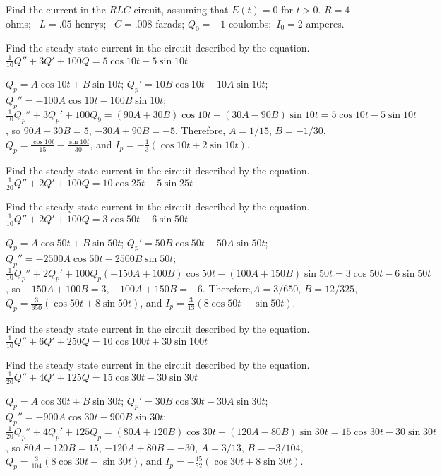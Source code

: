 \documentclass{ximera}
\begin{document}
\begin{problem}\label{exer:6.3.5}
Find the current in the
$RLC$ circuit, assuming that $E(t)=0$ for $t>0$.  $R=4$ ohms;  \, $L=.05$ henrys;  \, $C=.008$ farads;   $Q_0=-1$
coulombs;  \,$I_0=2$ amperes.
\end{problem}

\begin{problem}\label{exer:6.3.6}
Find the steady
state current in the circuit described by the  equation.
$\frac{1}{10}Q''+3Q'+100Q=5\cos10t-5\sin10t$

\begin{solution}
    $Q_p=A\cos10t+B\sin10t$;
$Q_p'=10B\cos10t-10A\sin10t$;
$Q_p''=-100A\cos10t-100B\sin10t$;
$\frac{1}{10}Q_p''+3Q_p'+100Q_9=
(90A+30B)\cos10t-(30A-90B)\sin10t=5\cos10t-5\sin10t$,
so $90A+30B=5$, $-30A+90B=-5$. Therefore, $A=1/15$, $B=-1/30$,
$Q_p=\frac{\cos10t}{15}-\frac{\sin10t}{30}$, and
$I_p=-\frac{1}{3}(\cos10t+2\sin10t)$.
\end{solution}
\end{problem}

\begin{problem}\label{exer:6.3.7}
Find the steady
state current in the circuit described by the  equation.
$\frac{1}{20}Q''+2Q'+100Q=10\cos25t-5\sin25t$
\end{problem}

\begin{problem}\label{exer:6.3.8}
Find the steady
state current in the circuit described by the  equation.
$\frac{1}{10}Q''+2Q'+100Q=3\cos50t-6\sin50t$

\begin{solution}
    $Q_p=A\cos 50t+B\sin 50t$;
$Q_p'=50B\cos 50t-50A\sin 50t$;
$Q_p''=-2500A\cos 50t-2500B\sin 50t$;
$\frac{1}{10}Q_p''+2Q_p'+100Q_p
(-150A+100B)\cos 50t-(100A+150B)\sin 50t=3\cos50t-6\sin50t$,
so $-150A+100B=3$, $-100A+150B=-6$. Therefore,$A=3/650$,
$B=12/325$, $Q_p=\frac{3}{650}(\cos50t+8\sin50t)$, and
$I_p= \frac{3}{13}(8\cos50t-\sin50t)$.
\end{solution}
\end{problem}

\begin{problem}\label{exer:6.3.9}
Find the steady
state current in the circuit described by the  equation.
$\frac{1}{10}Q''+6Q'+250Q=10\cos100t+30\sin100t$
\end{problem}

\begin{problem}\label{exer:6.3.10}
Find the steady
state current in the circuit described by the  equation.
$\frac{1}{20}Q''+4Q'+125Q=15\cos30t-30\sin30t$

\begin{solution}
    $Q_p=A\cos 30t+B\sin 30t$;
$Q_p'=30B\cos 30t-30A\sin 30t$;
$Q_p''=-900A\cos 30t-900B\sin 30t$;
$\frac{1}{20}Q_p''+4Q_p'+125Q_p=
(80A+120B)\cos 30t-(120A-80B)\sin 30t=15\cos30t-30\sin30t$, so
$80A+120B=15$, $-120A+80B=-30$,
$A=3/13$, $B=-3/104$,
$Q_p=
\frac{3}{104}(8\cos 30t-\sin 30t)$, and
$I_p=-\frac{45}{52}(\cos30t+8\sin30t)$.
\end{solution}
\end{problem}
\end{document}
